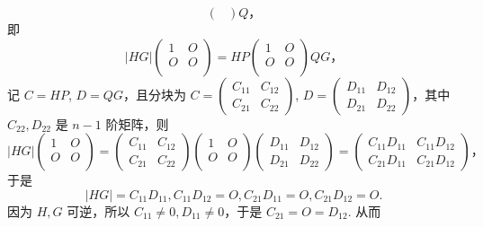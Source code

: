 \begin{enumerate}
\begin{enumerate}
\begin{enumerate}
\[\begin{pmatrix}
            \end{pmatrix}Q，\] 即 \[\lvert HG \rvert\begin{pmatrix}
                1 & O \\
                O & O \\
            \end{pmatrix} = HP\begin{pmatrix}
                1 & O \\
                O & O \\
            \end{pmatrix}QG，\] 记 $C = HP$, $D = QG$，且分块为 $C = \begin{pmatrix}
                C_{11} & C_{12} \\
                C_{21} & C_{22}
            \end{pmatrix}$, $D = \begin{pmatrix}
                D_{11} & D_{12} \\
                D_{21} & D_{22}
            \end{pmatrix}$，其中 $C_{22}, D_{22}$ 是 $n-1$ 阶矩阵，则 \[\lvert HG \rvert\begin{pmatrix}
                1 & O \\
                O & O \\
            \end{pmatrix} = \begin{pmatrix}
                C_{11} & C_{12} \\
                C_{21} & C_{22}
            \end{pmatrix} \begin{pmatrix}
                1 & O \\
                O & O \\
            \end{pmatrix} \begin{pmatrix}
                D_{11} & D_{12} \\
                D_{21} & D_{22}
            \end{pmatrix} = \begin{pmatrix}
                C_{11}D_{11} & C_{11}D_{12} \\
                C_{21}D_{11} & C_{21}D_{12}
            \end{pmatrix}，\] 于是 \[\lvert HG \rvert = C_{11}D_{11}, C_{11}D_{12} = O, C_{21}D_{11} = O, C_{21}D_{12} = O.\] 因为 $H, G$ 可逆，所以 $C_{11} \neq 0, D_{11} \neq 0$，于是 $C_{21} = O = D_{12}$. 从而 \begin{align*}

\end{align*}
\end{enumerate}
\end{enumerate}
\end{enumerate}
